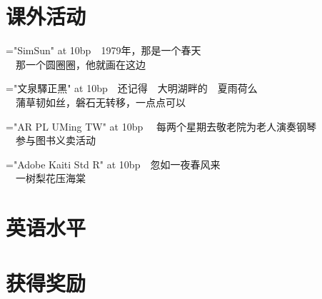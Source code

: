 \documentclass[11pt,a4paper]{moderncv}
\begin{document}
\section{课外活动}

					  {\font\zhfont="SimSun" at 10bp　1979年，那是一个春天　\\    
			           　那一个圆圈圈，他就画在这边}
% 
						
					  {\font\zhfont="文泉驛正黑" at 10bp　还记得　大明湖畔的　夏雨荷么\\
			           　蒲草韧如丝，磐石无转移，一点点可以}
                     

					  {\font\zhfont="AR PL UMing TW" at 10bp　 每两个星期去敬老院为老人演奏钢琴\\
			           　参与图书义卖活动}
 

					  {\font\zhfont="Adobe Kaiti Std R" at 10bp　忽如一夜春风来 \\
			           　一树梨花压海棠}
 

						
		
\section{英语水平}


 \section{获得奖励}




\end{document}
